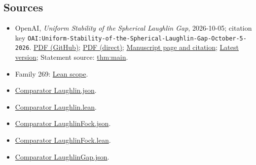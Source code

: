 \documentclass[11pt]{article}
\begin{document}
\subsection{Sources}
\begin{itemize}
\item OpenAI, \emph{Uniform Stability of the Spherical Laughlin Gap}, 2026-10-05; citation key \texttt{OAI:Uniform-Stability-of-the-Spherical-Laughlin-Gap-October-5-2026}. \href{https://github.com/openai/math/blob/adc7f1241b42e322a6451854ab7e4b4c146bf78a/preprints/Uniform-Stability-of-the-Spherical-Laughlin-Gap-October-5-2026/uniform-stability-spherical-laughlin-gap.pdf}{PDF (GitHub)}; \href{https://github.com/openai/math/raw/adc7f1241b42e322a6451854ab7e4b4c146bf78a/preprints/Uniform-Stability-of-the-Spherical-Laughlin-Gap-October-5-2026/uniform-stability-spherical-laughlin-gap.pdf}{PDF (direct)}; \href{https://github.com/openai/math/blob/adc7f1241b42e322a6451854ab7e4b4c146bf78a/preprints/Uniform-Stability-of-the-Spherical-Laughlin-Gap-October-5-2026/README.md}{Manuscript page and citation}; \href{https://github.com/openai/math/blob/main/preprints/Uniform-Stability-of-the-Spherical-Laughlin-Gap-October-5-2026/uniform-stability-spherical-laughlin-gap.pdf}{Latest version}; Statement source: \href{https://github.com/openai/math/blob/adc7f1241b42e322a6451854ab7e4b4c146bf78a/preprints/Uniform-Stability-of-the-Spherical-Laughlin-Gap-October-5-2026/build/sections/01-introduction.tex\#L52}{thm:main}.
\item Family 269: \href{https://github.com/openai/math/blob/adc7f1241b42e322a6451854ab7e4b4c146bf78a/lean/docs/269.md}{Lean scope}.
\item \href{https://github.com/openai/math/blob/adc7f1241b42e322a6451854ab7e4b4c146bf78a/lean/ComparatorChallenges/Laughlin.json}{Comparator Laughlin.json}.
\item \href{https://github.com/openai/math/blob/adc7f1241b42e322a6451854ab7e4b4c146bf78a/lean/ComparatorChallenges/Laughlin.lean}{Comparator Laughlin.lean}.
\item \href{https://github.com/openai/math/blob/adc7f1241b42e322a6451854ab7e4b4c146bf78a/lean/ComparatorChallenges/LaughlinFock.json}{Comparator LaughlinFock.json}.
\item \href{https://github.com/openai/math/blob/adc7f1241b42e322a6451854ab7e4b4c146bf78a/lean/ComparatorChallenges/LaughlinFock.lean}{Comparator LaughlinFock.lean}.
\item \href{https://github.com/openai/math/blob/adc7f1241b42e322a6451854ab7e4b4c146bf78a/lean/ComparatorChallenges/LaughlinGap.json}{Comparator LaughlinGap.json}.

\end{itemize}
\end{document}
